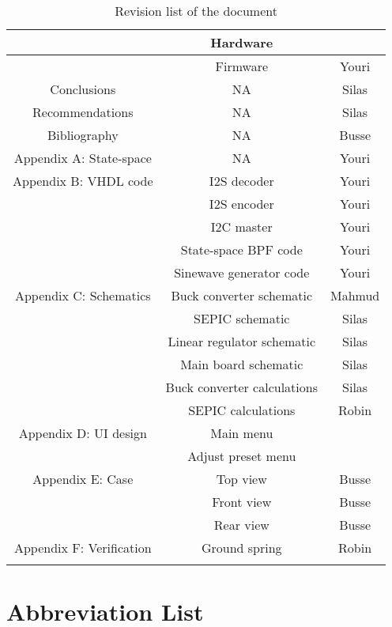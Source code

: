 \begin{justify}
\begin{longtable}{|c|c|c|}
								& Hardware						& 					\\ \hline
								& Firmware						& Youri				\\ \hline
	Conclusions					& NA							& Silas				\\ \hline
	Recommendations				& NA							& Silas				\\ \hline
	Bibliography				& NA							& Busse				\\ \hline
	Appendix A: State-space		& NA							& Youri				\\ \hline
	Appendix B: VHDL code		& I2S decoder					& Youri				\\ \hline
								& I2S encoder					& Youri				\\ \hline
								& I2C master					& Youri				\\ \hline
								& State-space BPF code			& Youri				\\ \hline
								& Sinewave generator code		& Youri				\\ \hline
	Appendix C: Schematics		& Buck converter schematic		& Mahmud			\\ \hline
								& SEPIC schematic				& Silas				\\ \hline
								& Linear regulator schematic	& Silas				\\ \hline
								& Main board schematic			& Silas				\\ \hline
								& Buck converter calculations	& Silas				\\ \hline
								& SEPIC calculations			& Robin				\\ \hline
	Appendix D: UI design		& Main menu						& 					\\ \hline
								& Adjust preset menu			& 					\\ \hline
	Appendix E: Case			& Top view						& Busse				\\ \hline
								& Front view					& Busse				\\ \hline
								& Rear view						& Busse				\\ \hline
	Appendix F: Verification	& Ground spring					& Robin				\\ \hline

	\caption{Revision list of the document}
	\label{table:revision_history}
\end{longtable}

\newpage
\pagestyle{plain}
\setcounter{page}{1}

\chapter*{Abbreviation List}


\end{justify}
